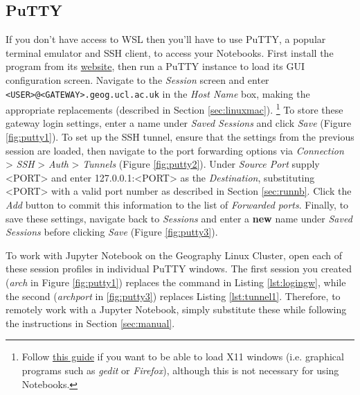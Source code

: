 \documentclass[a4paper]{article}
\begin{document}
\subsection{PuTTY}
\label{sec:putty}

If you don't have access to WSL then you'll have to use PuTTY, a popular terminal emulator and SSH client, to access your Notebooks. 
First install the program from its \href{http://www.chiark.greenend.org.uk/~sgtatham/putty/latest.html}{website}, then run a PuTTY instance to load its GUI configuration screen. 
Navigate to the \emph{Session} screen and enter \texttt{\textless{}USER\textgreater{}@\textless{}GATEWAY\textgreater{}.geog.ucl.ac.uk} in the \emph{Host Name} box, making the appropriate replacements (described in Section \ref{sec:linuxmac}).
\footnote{Follow \href{http://www.geo.mtu.edu/geoschem/docs/putty_install.html}{this guide} if you want to be able to load X11 windows (i.e. graphical programs such as \emph{gedit} or \emph{Firefox}), although this is not necessary for using Notebooks.}
To store these gateway login settings, enter a name under \emph{Saved Sessions} and click \emph{Save} (Figure \ref{fig:putty1}).
To set up the SSH tunnel, ensure that the settings from the previous session are loaded, then navigate to the port forwarding options via \emph{Connection} \textgreater{} \emph{SSH} \textgreater{} \emph{Auth} \textgreater{} \emph{Tunnels} (Figure \ref{fig:putty2}). 
Under \emph{Source Port} supply \textless{}PORT\textgreater{} and enter 127.0.0.1:\textless{}PORT\textgreater{} as the \emph{Destination}, substituting \textless{}PORT\textgreater{} with a valid port number as described in Section \ref{sec:runnb}.
Click the \emph{Add} button to commit this information to the list of \emph{Forwarded ports}.
Finally, to save these settings, navigate back to \emph{Sessions} and enter a \textbf{new} name under \emph{Saved Sessions} before clicking \emph{Save} (Figure \ref{fig:putty3}).

To work with Jupyter Notebook on the Geography Linux Cluster, open each of these session profiles in individual PuTTY windows.
The first session you created (\emph{arch} in Figure \ref{fig:putty1}) replaces the command in Listing \ref{lst:logingw}, while the second (\emph{archport} in \ref{fig:putty3}) replaces Listing \ref{lst:tunnel1}.
Therefore, to remotely work with a Jupyter Notebook, simply substitute these while following the instructions in Section \ref{sec:manual}.
\end{document}
